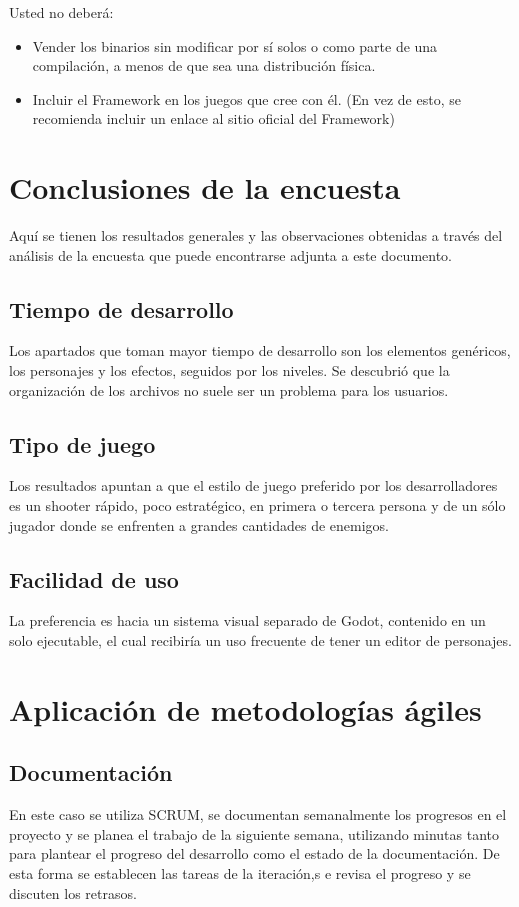 \documentclass[]{article}
\begin{document}
Usted no deber\'a:
\begin{itemize}
	\item Vender los binarios sin modificar por s\'i solos o como parte de una compilaci\'on, a menos de que sea una distribuci\'on f\'isica.  
	\item Incluir el Framework en los juegos que cree con \'el. (En vez de esto, se recomienda incluir un enlace al sitio oficial del Framework)
\end{itemize}
\section{Conclusiones de la encuesta}
Aqu\'i se tienen los resultados generales y las observaciones obtenidas a trav\'es del an\'alisis de la encuesta que puede encontrarse adjunta a este documento. 
\subsection{Tiempo de desarrollo}
Los apartados que toman mayor tiempo de desarrollo son los elementos gen\'ericos, los personajes y los efectos, seguidos por los niveles. Se descubri\'o que la organizaci\'on de los archivos no suele ser un problema para los usuarios. 
\subsection{Tipo de juego}
Los resultados apuntan a que el estilo de juego preferido por los desarrolladores es un shooter r\'apido, poco estrat\'egico, en primera o tercera persona y de un s\'olo jugador donde se enfrenten a grandes cantidades de enemigos. 
\subsection{Facilidad de uso}
La preferencia es hacia un sistema visual separado de Godot, contenido en un solo ejecutable, el cual recibir\'ia un uso frecuente de tener un editor de personajes. 
\section{Aplicaci\'on de metodolog\'ias \'agiles}
\subsection{Documentaci\'on}

En este caso se utiliza SCRUM, se documentan semanalmente los progresos en el proyecto y se planea el trabajo de la siguiente semana, utilizando minutas tanto para plantear el progreso del desarrollo como el estado de la documentaci\'on. De esta forma se establecen las tareas de la iteraci\'on,s e revisa el progreso y se discuten los retrasos.
\end{document}
